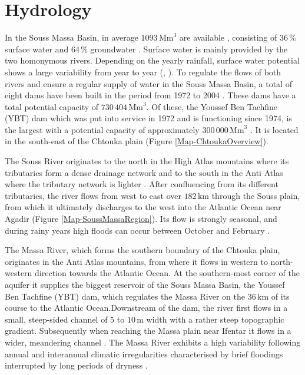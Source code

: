 \section{Hydrology}
\label{Sec-SouMaHydrology}

In the Souss Massa Basin, in average $1093 \, \textrm{Mm}^3$ are available \parencite{ABHSMD.2005}, consisting of $36 \, \%$ surface water and $64 \, \%$ groundwater \parencite{Choukr.2017}. Surface water is mainly provided by the two homonymous rivers. Depending on the yearly rainfall, surface water potential shows a large variability from year to year (\cite{Choukr.2017}, \cite{ABHSMD-HydStats.2022}). To regulate the flows of both rivers and ensure a regular supply of water in the Souss Massa Basin, a total of eight dams have been built in the period from 1972 to 2004 \parencite{Choukr.2017}. These dams have a total potential capacity of $730 \, 404 \, \textrm{Mm}^3$. Of these, the Youssef Ben Tachfine (YBT) dam which was put into service in 1972 and is functioning since 1974, is the largest with a potential capacity of approximately $300 \,000 \, \textrm{Mm}^3$ \parencite{ABHSM-Dams.2022}. It is located in the south-east of the Chtouka plain (Figure \ref{Map-ChtoukaOverview}).

The Souss River originates to the north in the High Atlas mountains where its tributaries form a dense drainage network and to the south in the Anti Atlas where the tributary network is lighter \parencite{Hssaisoune.2017}. After confluencing from its different tributaries, the river flows from west to east over $182 \, \textrm{km}$ through the Souss plain, from which it ultimately discharges to the west into the Atlantic Ocean near Agadir (Figure \ref{Map-SoussMassaRegion}). Its flow is strongly seasonal, and during rainy years high floods can occur between October and February \parencite{Hssaisoune.2017}.

The Massa River, which forms the southern boundary of the Chtouka plain, originates in the Anti Atlas mountains, from where it flows in western to north-western direction towards the Atlantic Ocean. At the southern-most corner of the aquifer it supplies the biggest reservoir of the Souss Massa Basin, the Youssef Ben Tachfine (YBT) dam, which regulates the Massa River on the $36 \, \textrm{km}$ of its course to the Atlantic Ocean.Downstream of the dam, the river first flows in a small, steep-sided channel of $5$ to $10 \, \textrm{m}$ width with a rather steep topographic gradient. Subsequently when reaching the Massa plain near Ifentar it flows in a wider, meandering channel \parencite{Horn.2021}. The Massa River exhibits a high variability following annual and interannual climatic irregularities characterised by brief floodings interrupted by long periods of dryness \parencite{Hssaisoune.2017}.

